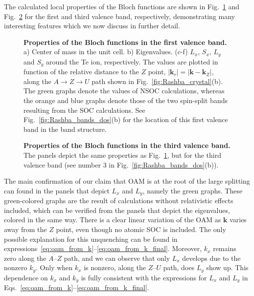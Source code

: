 The calculated local properties of the Bloch functions are shown in Fig.~\ref{fig:Rashba_oamvseigvalv1} and Fig.~\ref{fig:Rashba_oamvseigvalv2} for the first and third valence band, respectively, demonstrating many interesting features which we now discuss in further detail.
\begin{figure}
	\centering
{}
\caption{\label{fig:Rashba_oamvseigvalv1}{\bf Properties of the Bloch functions in the first valence band.} a) Center of mass in the unit cell. b) Eigenvalues. (c-f) $L_x$, $S_x$, $L_y$ and $S_y$ around the Te ion, respectively. The values are plotted in function of the relative distance to the $Z$ point, $|\bm{k}_r| = |\bm{k} - \bm{k}_Z|$, along the $A \rightarrow Z \rightarrow U$ path shown in Fig.~\ref{fig:Rashba_crystal}(b). The green graphs denote the values of \gls{NSOC} calculations, whereas the orange and blue graphs denote those of the two spin-split bands resulting from the \gls{SOC} calculations. See Fig.~\ref{fig:Rashba_bands_dos}(b) for the location of this first valence band in the band structure.}
\end{figure}
\begin{figure}[h!]
	\centering
{}
\caption{\label{fig:Rashba_oamvseigvalv2}{\bf Properties of the Bloch functions in the third valence band.} The panels depict the same properties as Fig.~\ref{fig:Rashba_oamvseigvalv1}, but for the third valence band (see number 3 in Fig.~\ref{fig:Rashba_bands_dos}(b)).}
\end{figure}
    
The main confirmation of our claim that \gls{OAM} is at the root of the large splitting can found in the panels that depict $L_x$ and $L_y$, namely the green graphs. These green-colored graphs are the result of calculations without relativistic effects included, which can be verified from the panels that depict the eigenvalues, colored in the same way.
There is a clear linear variation of the \gls{OAM} as $\bm k$ varies away from the $Z$ point, even though no atomic \gls{SOC} is included.
The only possible explanation for this unquenching can be found in expressions~\eqref{eq:oam_from_k}--\eqref{eq:oam_from_k_final}.
Moreover, $k_x$ remains zero along the $A$--$Z$ path, and we can observe that only $L_x$ develops due to the nonzero $k_y$. Only when $k_x$ is nonzero, along the $Z$--$U$ path, does $L_y$ show up. This dependence on $k_x$ and $k_y$ is fully consistent with the expressions for $L_x$ and $L_y$ in Eqs.~\eqref{eq:oam_from_k}--\eqref{eq:oam_from_k_final}.
    
